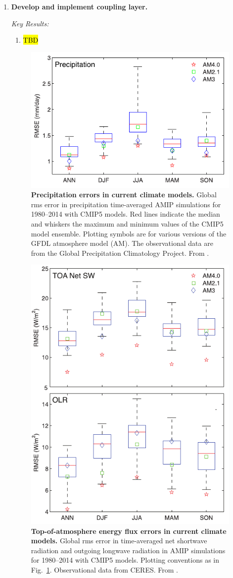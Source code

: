 \documentclass{article}
\begin{document}
\begin{enumerate}
\item \textbf{Develop and implement coupling layer.}
    
    \emph{Key Results:}
     \begin{enumerate}
        \item \hl{TBD}
        \end{enumerate}

\begin{figure}[htb]
     \centerline{\includegraphics[width=.6\textwidth]{Zhao18a-Fig-14.pdf}}
      \caption{\textbf{Precipitation errors in current climate models.} Global rms error in precipitation time-averaged AMIP simulations  for 1980--2014 with CMIP5 models. Red lines indicate the median and whiskers the maximum and minimum values of the CMIP5 model ensemble. Plotting symbols are for various versions of the GFDL atmosphere model (AM). The observational data are from the Global Precipitation Climatology Project. From \protect\citet{Zhao18b}.}\label{f:CMIP-precip-error}
\end{figure}
\begin{figure}[htb]
     \centerline{\includegraphics[width=.6\textwidth]{Zhao18a-Fig-15-16.pdf}}
      \caption{\textbf{Top-of-atmosphere energy flux errors in current climate models.} Global rms error in time-averaged net shortwave radiation and outgoing longwave radiation in AMIP simulations for 1980--2014 with CMIP5 models. Plotting conventions as in Fig.~\ref{f:CMIP-precip-error}. Observational data from CERES. From \protect\citet{Zhao18b}.}\label{f:CMIP-TOA-error}
 \end{figure}
        

\end{enumerate}
\end{document}
